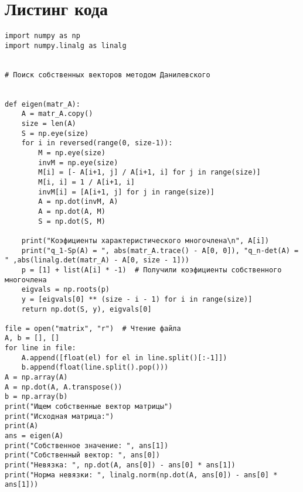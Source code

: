 \documentclass[11.4pt]{article}
\begin{document}
\section{Листинг кода}
\begin{verbatim}
import numpy as np
import numpy.linalg as linalg


# Поиск собственных векторов методом Данилевского


def eigen(matr_A):
    A = matr_A.copy()
    size = len(A)
    S = np.eye(size)
    for i in reversed(range(0, size-1)):
        M = np.eye(size)
        invM = np.eye(size)
        M[i] = [- A[i+1, j] / A[i+1, i] for j in range(size)]
        M[i, i] = 1 / A[i+1, i]
        invM[i] = [A[i+1, j] for j in range(size)]
        A = np.dot(invM, A)
        A = np.dot(A, M)
        S = np.dot(S, M)

    print("Коэфициенты характеристического многочлена\n", A[i])
    print("q_1-Sp(A) = ", abs(matr_A.trace() - A[0, 0]), "q_n-det(A) = " ,abs(linalg.det(matr_A) - A[0, size - 1]))
    p = [1] + list(A[i] * -1)  # Получили коэфициенты собственного многочлена
    eigvals = np.roots(p)
    y = [eigvals[0] ** (size - i - 1) for i in range(size)]
    return np.dot(S, y), eigvals[0]

file = open("matrix", "r")  # Чтение файла
A, b = [], []
for line in file:
    A.append([float(el) for el in line.split()[:-1]])
    b.append(float(line.split().pop()))
A = np.array(A)
A = np.dot(A, A.transpose())
b = np.array(b)
print("Ищем собственные вектор матрицы")
print("Исходная матрица:")
print(A)
ans = eigen(A)
print("Собственное значение: ", ans[1])
print("Собственный вектор: ", ans[0])
print("Невязка: ", np.dot(A, ans[0]) - ans[0] * ans[1])
print("Норма невязки: ", linalg.norm(np.dot(A, ans[0]) - ans[0] * ans[1]))
\end{verbatim}
\end{document}
